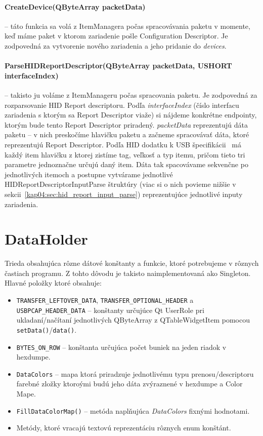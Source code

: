 \paragraph{CreateDevice(QByteArray packetData)} -- táto funkcia sa volá z ItemManagera počas spracovávania paketu v momente, keď máme paket v ktorom zariadenie pošle Configuration Descriptor. Je zodpovedná za vytvorenie nového zariadenia a jeho pridanie do \textit{devices}.

\paragraph{ParseHIDReportDescriptor(QByteArray packetData, USHORT interfaceIndex)} \label{kap04:sec:parse_hid} -- takisto ju voláme z ItemManageru počas spracovania paketu. Je zodpovedná za rozparsovanie HID Report descriptoru. Podľa \textit{interfaceIndex} (číslo interfacu zariadenia s ktorým sa Report Descriptor viaže) si nájdeme konkrétne endpointy, ktorým bude tento Report Descriptor priradený. \textit{packetData} reprezentujú dáta paketu -- v nich preskočíme hlavičku paketu a začneme spracovávať dáta, ktoré reprezentujú Report Descriptor. Podľa HID dodatku k USB špecifikácii~\cite{usbhid} má každý item hlavičku z ktorej zistíme tag, veľkosť a typ itemu, pričom tieto tri parametre jednoznačne určujú daný item. Dáta tak spacovávame sekvenčne po jednotlivých itemoch a postupne vytvárame jednotlivé HIDReportDescriptorInputParse štruktúry (viac si o nich povieme nižšie v sekcii~\ref{kap04:sec:hid_report_input_parse}) reprezentujúce jednotlivé inputy zariadenia.

\section{DataHolder}
\label{kap04:sec:data_holder}
Trieda obsahujúca rôzne dátové konštanty a funkcie, ktoré potrebujeme v rôznych častiach programu. Z tohto dôvodu je takisto naimplementovaná ako Singleton. Hlavné položky ktoré obsahuje:
\begin{itemize}
\item \texttt{TRANSFER\_LEFTOVER\_DATA}, \texttt{TRANSFER\_OPTIONAL\_HEADER} a \texttt{USBPCAP\_HEADER\_DATA} -- konštanty určujúce Qt UserRole pri ukladaní/načítaní jednotlivých QByteArray z QTableWidgetItem pomocou \texttt{setData()}/\texttt{data()}.
\item \texttt{BYTES\_ON\_ROW} -- konštanta určujúca počet buniek na jeden riadok v hexdumpe.
\item \texttt{DataColors} -- mapa ktorá priradzuje jednotlivému typu prenosu/descriptoru farebné zložky ktoroými budú jeho dáta zvýraznené v hexdumpe a Color Mape.
\item \texttt{FillDataColorMap()} -- metóda naplňujúca \textit{DataColors} fixnými hodnotami.
\item Metódy, ktoré vracajú textovú reprezentáciu rôznych enum konštánt.
\end{itemize}

